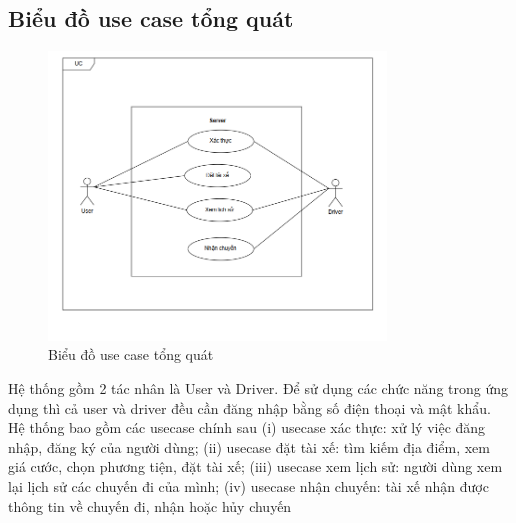 \documentclass[../DoAn.tex]{subfiles}
\begin{document}
\subsection{Biểu đồ use case tổng quát}
\label{subsection:2.2.1}
\begin{figure}[H]
    \centering
    \includegraphics[width=0.8\textwidth]{Hinhve/Usecase_tong_quan.png}
    \caption{Biểu đồ use case tổng quát}
    \label{fig:use_case_total}
\end{figure}
Hệ thống gồm 2 tác nhân là User và Driver.
Để sử dụng các chức năng trong ứng dụng thì cả user và driver đều cần đăng nhập bằng số điện thoại và mật khẩu.
Hệ thống bao gồm các usecase chính sau (i) usecase xác thực: xử lý việc đăng nhập, đăng ký của người dùng; 
(ii) usecase đặt tài xế: tìm kiếm địa điểm, xem giá cước, chọn phương tiện, đặt tài xế;
(iii) usecase xem lịch sử: người dùng xem lại lịch sử các chuyến đi của mình;
(iv) usecase nhận chuyến: tài xế nhận được thông tin về chuyến đi, nhận hoặc hủy chuyến
\end{document}
